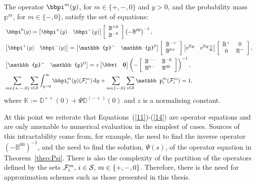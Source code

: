\begin{theo} 
	\label{theo:density} 
The operator ${\bbpi}^{m}(y)$, for $m \in \{+,-,0\}$ and $y > 0$, and the probability mass $\mathbb{p}^{m}$, for $m \in \{-,0\}$, satisfy the set of equations:
% 	 
	\begin{align} 
	&\label{11} \; \bbpi^{0}(y) = \vligne{\bbpi^{+}(y) & \bbpi^{-}(y)}\left[\begin{array}{l} \mathbb{B}^{+0} \\ \mathbb{B}^{-0} \end{array} \right]\left(-\mathbb{B}^{00}\right)^{-1}, \\
	&  \vligne{\bbpi^{+}(y) & \bbpi^{-}(y)} = \vligne{\mathbb{p}^{-} & \mathbb{p}^{0}}\left[\begin{array}{l} \mathbb{B}^{-+} \\ \mathbb{B}^{0+} \end{array} \right]\vligne{e^{\mathbb{K}y} & e^{\mathbb{K}y}\mathbb\Psi}\left[\begin{array}{cc} \mathbb{R}^{+} & 0 \\ 0 & \mathbb{R}^{-}\end{array}\right], \\
	&  \vligne{\mathbb{p}^{-}  & \mathbb{p}^{0}} = z \vligne{{\bbxi} & \bs{0}} 
	\left(-\left[\begin{array}{ll} 
		\mathbb{B}^{--} & \mathbb{B}^{-0} \\
		\mathbb{B}^{0-} & \mathbb{B}^{00} 
		\end{array} \right] \right)^{-1},  \label{eqn:mass}\\
	& \sum_{m \in \{+,-,0\}}\sum_{i \in \mathcal{S}} \int_{y = 0}^{\infty} \bbpi_i^{m}(y)(\mathcal{F}^{m}_i)\wrt y + \sum_{m \in \{-,0\}} \sum_{i \in \mathcal{S}}\mathbb p^{m}_i(\mathcal{F}^{m}_i) = 1, \label{14}
	\end{align}
	where $\mathbb{K} := \mathbb{D}^{++}(0) + \mathbb\Psi\mathbb{D}^{(-+)}(0)$ and $z$ is a normalising constant. 
\end{theo} 

At this point we reiterate that Equations~(\ref{11})-(\ref{14}) are operator equations and are only amenable to numerical evaluation in the simplest of cases. Sources of this intractability come from, for example, the need to find the inverse operator \(( - \mathbb B^{00})^{-1}\), and the need to find the solution, \(\mathbb \Psi(s)\), of the operator equation in Theorem~\ref{theo:Psi}. There is also the complexity of the partition of the operators defined by the sets \(\mathcal F_{i}^m,\, i\in\mathcal{S},\,m\in\{+,-,0\}\). Therefore, there is the need for approximation schemes such as those presented in this thesis. 


